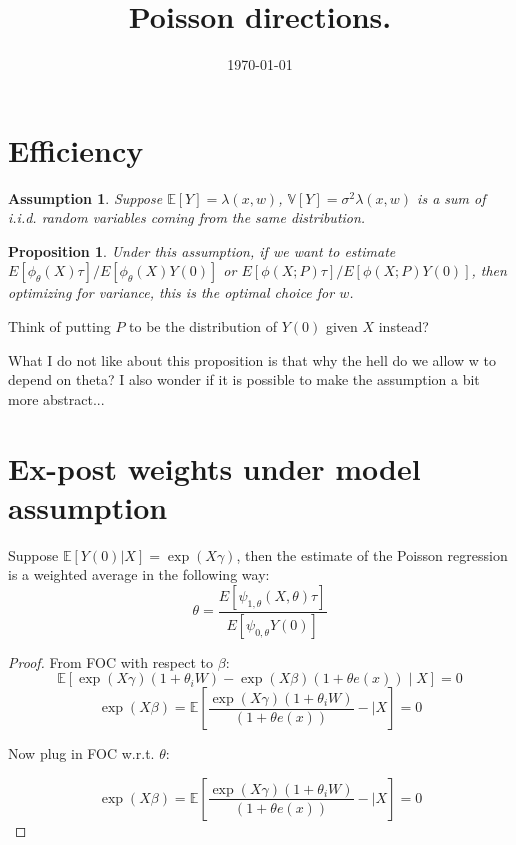 \documentclass[12pt,a4paper]{article}
\title{Poisson directions.}
\date{\today}
\newtheorem{assu}{Assumption}
\newtheorem{prop}{Proposition}
\begin{document}
\section{Efficiency}

\begin{assu}
    Suppose $\mathbb{E}[Y] = \lambda(x, w)$, $\mathbb{V}[Y] = \sigma^2\lambda(x, w)$ is a sum of i.i.d. random variables coming from the same distribution.
\end{assu}


\begin{prop}
    Under this assumption, if we want to estimate $E[\phi_{\theta}(X)\tau] / E[\phi_{\theta}(X) Y(0)]$ or $E[\phi(X; P)\tau] / E[\phi(X; P)Y(0)]$, then optimizing for variance, this is the optimal choice for $w$.
\end{prop}

Think of putting $P$ to be the distribution of $Y(0)$ given $X$ instead?





What I do not like about this proposition is that why the hell do we allow w to depend on theta? I also wonder if it is possible to make the assumption a bit more abstract...


\section{Ex-post weights under model assumption}

\begin{proposition}
    Suppose $\mathbb{E}[Y(0) | X] = \exp(X\gamma)$, then the estimate of the Poisson regression is a weighted average in the following way:
\begin{equation}
    \theta = \frac{E[\psi_{1, \theta}(X, \theta)\tau]}{E[\psi_{0, \theta} Y(0)]}
\end{equation}
\end{proposition}

\begin{proof}
    From FOC with respect to $\beta$:
    \[\mathbb{E}[\exp(X\gamma)(1 + \theta_i W) - \exp(X\beta)(1 + \theta e(x))\mid X] = 0\]
    \[\exp(X\beta) = \mathbb{E}[\frac{\exp(X\gamma)(1 + \theta_i W)}{(1 + \theta e(x))} - \mid X] = 0\]


    Now plug in FOC w.r.t. $\theta$:

    \[\exp(X\beta) = \mathbb{E}[\frac{\exp(X\gamma)(1 + \theta_i W)}{(1 + \theta e(x))} - \mid X] = 0\]
\end{proof}
\end{document}
